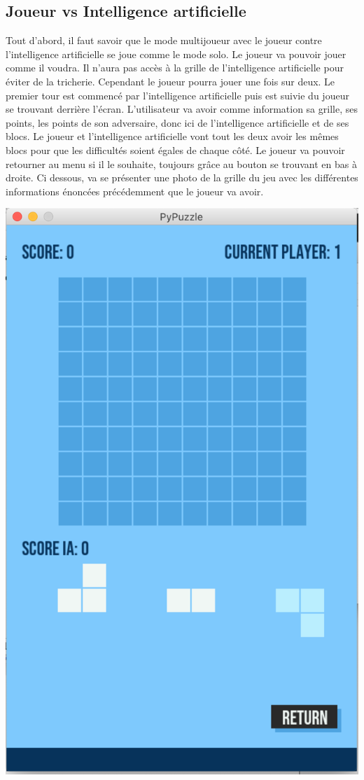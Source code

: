 \documentclass[]{report}
\begin{document}
\subsection{Joueur vs Intelligence artificielle}
Tout d'abord, il faut savoir que le mode multijoueur avec le joueur contre l'intelligence artificielle se joue comme le mode solo. Le joueur va pouvoir jouer comme il voudra. Il n'aura pas accès à la grille de l'intelligence artificielle pour éviter de la tricherie. Cependant le joueur pourra jouer une fois sur deux. Le premier tour est commencé par l'intelligence artificielle puis est suivie du joueur se trouvant derrière l'écran. L'utilisateur va avoir comme information sa grille, ses points, les points de son adversaire, donc ici de l'intelligence artificielle et de ses blocs. Le joueur et l'intelligence artificielle vont tout les deux avoir les mêmes blocs pour que les difficultés soient égales de chaque côté. Le joueur va pouvoir retourner au menu si il le souhaite, toujours grâce au bouton se trouvant en bas à droite. Ci dessous, va se présenter une photo de la grille du jeu avec les différentes informations énoncées précédemment que le joueur va avoir.
\begin{center}
\includegraphics[scale=0.2]{images/multi.png}\\
\end{center} 
\end{document}
